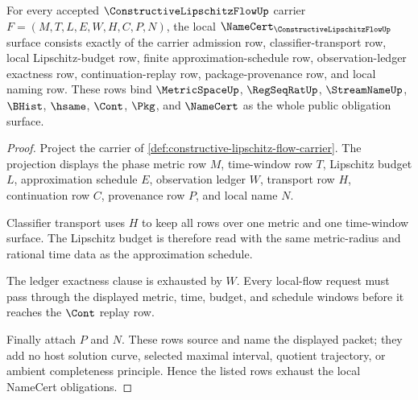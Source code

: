 \begin{theorem}
\label{thm:constructive-lipschitz-flow-namecert-obligations}
For every accepted $\ConstructiveLipschitzFlowUp$ carrier
$F=(M,T,L,E,W,H,C,P,N)$, the local
$\NameCert_{\ConstructiveLipschitzFlowUp}$ surface consists exactly of the
carrier admission row, classifier-transport row, local Lipschitz-budget row,
finite approximation-schedule row, observation-ledger exactness row,
continuation-replay row, package-provenance row, and local naming row. These
rows bind $\MetricSpaceUp$, $\RegSeqRatUp$, $\StreamNameUp$, $\BHist$,
$\hsame$, $\Cont$, $\Pkg$, and $\NameCert$ as the whole public obligation
surface.
\end{theorem}
\begin{proof}
Project the carrier of
\autoref{def:constructive-lipschitz-flow-carrier}. The projection displays
the phase metric row $M$, time-window row $T$, Lipschitz budget $L$,
approximation schedule $E$, observation ledger $W$, transport row $H$,
continuation row $C$, provenance row $P$, and local name $N$.

Classifier transport uses $H$ to keep all rows over one metric and one
time-window surface. The Lipschitz budget is therefore read with the same
metric-radius and rational time data as the approximation schedule.

The ledger exactness clause is exhausted by $W$. Every local-flow request
must pass through the displayed metric, time, budget, and schedule windows
before it reaches the $\Cont$ replay row.

Finally attach $P$ and $N$. These rows source and name the displayed packet;
they add no host solution curve, selected maximal interval, quotient
trajectory, or ambient completeness principle. Hence the listed rows exhaust
the local NameCert obligations.
\end{proof}

